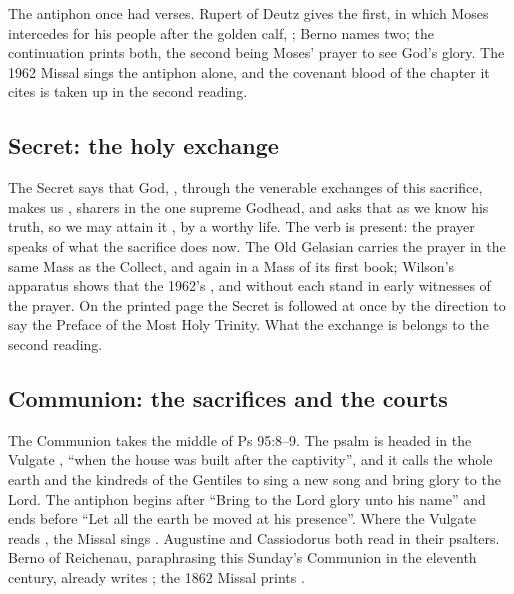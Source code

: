 The antiphon once had verses. Rupert of Deutz gives the first, in which Moses
intercedes for his people after the golden calf, ; Berno names two; the continuation prints both,
the second being Moses' prayer to see God's glory. The 1962 Missal sings the
antiphon alone, and the covenant blood of the chapter it cites is taken up in
the second reading.

\subsection{Secret: the holy exchange}

The Secret says that God, ,
through the venerable exchanges of this sacrifice, makes us , sharers in the one supreme Godhead, and asks that as
we know his truth, so we may attain it , by a worthy
life. The verb  is present: the prayer speaks of what the
sacrifice does now. The Old Gelasian carries the prayer in the same Mass as the
Collect, and again in a Mass of its first book; Wilson's apparatus shows that
the 1962's ,  and 
without  each stand in early witnesses of the prayer. On the
printed page the Secret is followed at once by the direction to say the
Preface of the Most Holy Trinity. What the exchange is belongs to the second
reading.

\subsection{Communion: the sacrifices and the courts}

The Communion takes the middle of Ps 95:8--9. The psalm is headed in the
Vulgate , ``when the house was built after the captivity'', and it calls
the whole earth and the kindreds of the Gentiles to sing a new song and bring
glory to the Lord. The antiphon begins after ``Bring to the Lord glory unto his
name'' and ends before ``Let all the earth be moved at his presence''. Where the
Vulgate reads , the Missal sings . Augustine and Cassiodorus both read  in their
psalters. Berno of Reichenau, paraphrasing this Sunday's Communion in the
eleventh century, already writes ; the 1862 Missal
prints .

